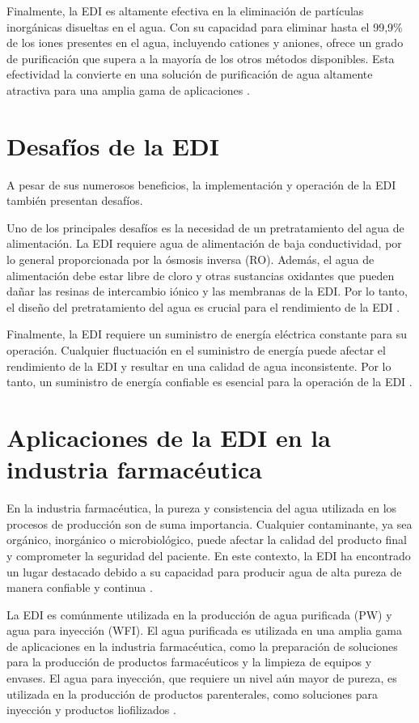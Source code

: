 Finalmente, la EDI es altamente efectiva en la eliminación de partículas inorgánicas disueltas en el agua. Con su capacidad
para eliminar hasta el 99,9\% de los iones presentes en el agua, incluyendo cationes y aniones, ofrece un grado de purificación
que supera a la mayoría de los otros métodos disponibles. Esta efectividad la convierte en una solución de purificación de
agua altamente atractiva para una amplia gama de aplicaciones \cite{lenntechElectrodeionizationEDI}.

\section{Desafíos de la EDI}
A pesar de sus numerosos beneficios, la implementación y operación de la EDI también presentan desafíos.

Uno de los principales desafíos es la necesidad de un pretratamiento del agua de alimentación. La EDI requiere agua de alimentación
de baja conductividad, por lo general proporcionada por la ósmosis inversa (RO). Además, el agua de alimentación debe estar libre
de cloro y otras sustancias oxidantes que pueden dañar las resinas de intercambio iónico y las membranas de la EDI. Por lo tanto,
el diseño del pretratamiento del agua es crucial para el rendimiento de la EDI \cite{lenntechElectrodeionizationEDI}.

Finalmente, la EDI requiere un suministro de energía eléctrica constante para su operación. Cualquier fluctuación en el suministro
de energía puede afectar el rendimiento de la EDI y resultar en una calidad de agua inconsistente. Por lo tanto, un suministro de
energía confiable es esencial para la operación de la EDI \cite{lenntechElectrodeionizationEDI}.

\section{Aplicaciones de la EDI en la industria farmacéutica}
En la industria farmacéutica, la pureza y consistencia del agua utilizada en los procesos de producción son de suma importancia.
Cualquier contaminante, ya sea orgánico, inorgánico o microbiológico, puede afectar la calidad del producto final y comprometer la
seguridad del paciente. En este contexto, la EDI ha encontrado un lugar destacado debido a su capacidad para producir agua de alta
pureza de manera confiable y continua \cite{condorchemUltrapureWaterElectrodeionization2019}.

La EDI es comúnmente utilizada en la producción de agua purificada (PW) y agua para inyección (WFI). El agua purificada es utilizada
en una amplia gama de aplicaciones en la industria farmacéutica, como la preparación de soluciones para la producción de productos
farmacéuticos y la limpieza de equipos y envases. El agua para inyección, que requiere un nivel aún mayor de pureza, es utilizada
en la producción de productos parenterales, como soluciones para inyección y productos liofilizados \cite{condorchemUltrapureWaterElectrodeionization2019}.

